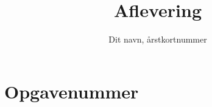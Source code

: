\documentclass[a4paper,oneside,article]{memoir}
\begin{document}
\author{Dit navn, årstkortnummer}
\title{Aflevering}
\maketitle

\chapter{Opgavenummer}
\end{document}
